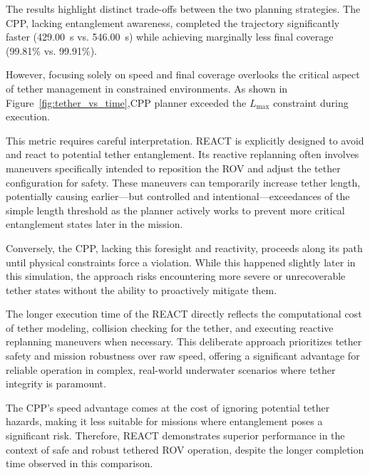 The results highlight distinct trade-offs between the two planning strategies. The \ac{CPP}, lacking entanglement awareness, completed the trajectory significantly faster (429.00~s vs. 546.00~s) while achieving marginally less final coverage (99.81\% vs. 99.91\%).

However, focusing solely on speed and final coverage overlooks the critical aspect of tether management in constrained environments. As shown in Figure~\ref{fig:tether_vs_time},\ac{CPP} planner exceeded the $L_{\text{max}}$ constraint during execution. 

This metric requires careful interpretation. \ac{REACT} is explicitly designed to avoid and react to potential tether entanglement. Its reactive replanning often involves maneuvers specifically intended to reposition the \ac{ROV} and adjust the tether configuration for safety. These maneuvers can temporarily increase tether length, potentially causing earlier—but controlled and intentional—exceedances of the simple length threshold as the planner actively works to prevent more critical entanglement states later in the mission.

Conversely, the \ac{CPP}, lacking this foresight and reactivity, proceeds along its path until physical constraints force a violation. While this happened slightly later in this simulation, the approach risks encountering more severe or unrecoverable tether states without the ability to proactively mitigate them.

The longer execution time of the \ac{REACT} directly reflects the computational cost of tether modeling, collision checking for the tether, and executing reactive replanning maneuvers when necessary. This deliberate approach prioritizes tether safety and mission robustness over raw speed, offering a significant advantage for reliable operation in complex, real-world underwater scenarios where tether integrity is paramount. 

The \ac{CPP}'s speed advantage comes at the cost of ignoring potential tether hazards, making it less suitable for missions where entanglement poses a significant risk. Therefore, \ac{REACT} demonstrates superior performance in the context of safe and robust tethered \ac{ROV} operation, despite the longer completion time observed in this comparison.












